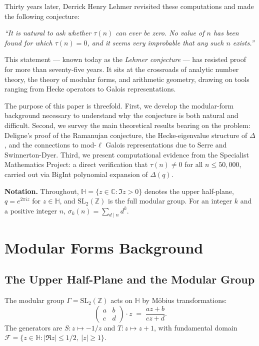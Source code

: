 \documentclass[12pt,a4paper]{amsart}
\theoremstyle{definition}
\begin{document}
Thirty years later, Derrick Henry Lehmer \cite{Lehmer1947} revisited these
computations and made the following conjecture:

\begin{center}
  \textit{``It is natural to ask whether $\tau(n)$ can ever be zero. No value of $n$
  has been found for which $\tau(n) = 0$, and it seems very improbable that any such
  $n$ exists.''}
\end{center}

This statement --- known today as the \emph{Lehmer conjecture} --- has resisted
proof for more than seventy-five years. It sits at the crossroads of analytic number
theory, the theory of modular forms, and arithmetic geometry, drawing on tools
ranging from Hecke operators to Galois representations.

The purpose of this paper is threefold. First, we develop the modular-form
background necessary to understand why the conjecture is both natural and difficult.
Second, we survey the main theoretical results bearing on the problem: Deligne's
proof of the Ramanujan conjecture, the Hecke-eigenvalue structure of $\Delta$, and
the connections to mod-$\ell$ Galois representations due to Serre and
Swinnerton-Dyer. Third, we present computational evidence from the Specialist
Mathematics Project: a direct verification that $\tau(n) \neq 0$ for all
$n \leq 50{,}000$, carried out via BigInt polynomial expansion of
$\Delta(q)$.

\medskip
\noindent\textbf{Notation.} Throughout, $\mathbb{H} = \{z \in \mathbb{C} : \Im z > 0\}$
denotes the upper half-plane, $q = e^{2\pi i z}$ for $z \in \mathbb{H}$, and
$\mathrm{SL}_2(\mathbb{Z})$ is the full modular group. For an integer $k$ and a
positive integer $n$, $\sigma_k(n) = \sum_{d \mid n} d^k$.

\section{Modular Forms Background}

\subsection{The Upper Half-Plane and the Modular Group}

The modular group $\Gamma = \mathrm{SL}_2(\mathbb{Z})$ acts on $\mathbb{H}$ by
M\"obius transformations:
\[
  \begin{pmatrix} a & b \\ c & d \end{pmatrix} \cdot z
  \;=\; \frac{az+b}{cz+d}.
\]
The generators are $S: z \mapsto -1/z$ and $T: z \mapsto z+1$, with fundamental
domain $\mathcal{F} = \{z \in \mathbb{H} : |\Re z| \leq 1/2,\ |z| \geq 1\}$.
\end{document}
